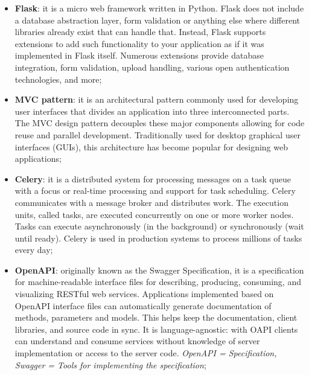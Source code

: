 \documentclass[oneside]{article}
\begin{document}
\begin{itemize}
\begin{itemize}
            \item \textbf{Flask}: it is a micro web framework written in Python. Flask does not include a database abstraction layer, form validation or anything else where different libraries already exist that can handle that. Instead, Flask supports extensions to add such functionality to your application as if it was implemented in Flask itself. Numerous extensions provide database integration, form validation, upload handling, various open authentication technologies, and more;
            
            \item \textbf{MVC pattern}: it is an architectural pattern commonly used for developing user interfaces that divides an application into three interconnected parts. The MVC design pattern decouples these major components allowing for code reuse and parallel development. Traditionally used for desktop graphical user interfaces (GUIs), this architecture has become popular for designing web applications;
            \begin{figure}[!htb]
            \end{figure}
            
            \item \textbf{Celery}: it is a distributed system for processing messages on a task queue with a focus or real-time processing and support for task scheduling. Celery communicates with a message broker and distributes work. The execution units, called tasks, are executed concurrently on one or more worker nodes. Tasks can execute asynchronously (in the background) or synchronously (wait until ready). Celery is used in production systems to process millions of tasks every day;
            
            \item \textbf{OpenAPI}: originally known as the Swagger Specification, it is a specification for machine-readable interface files for describing, producing, consuming, and visualizing RESTful web services. Applications implemented based on OpenAPI interface files can automatically generate documentation of methods, parameters and models. This helps keep the documentation, client libraries, and source code in sync. It is language-agnostic: with OAPI clients can understand and consume services without knowledge of server implementation or access to the server code. \newline \textit{OpenAPI = Specification, Swagger = Tools for implementing the specification};
        \end{itemize}
\end{itemize}
\end{document}
